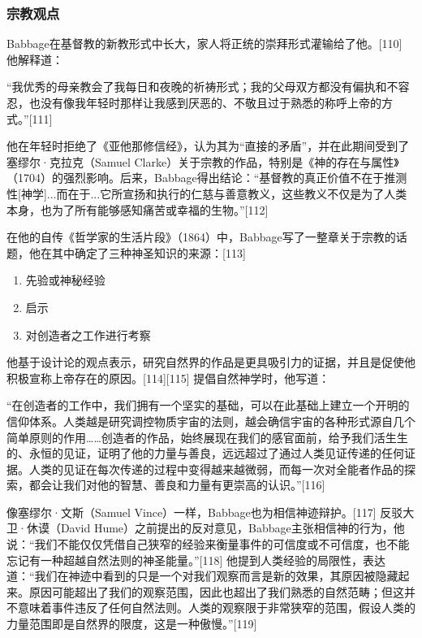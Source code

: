 \subsubsection{宗教观点}
Babbage在基督教的新教形式中长大，家人将正统的崇拜形式灌输给了他。[110] 他解释道：

“我优秀的母亲教会了我每日和夜晚的祈祷形式；我的父母双方都没有偏执和不容忍，也没有像我年轻时那样让我感到厌恶的、不敬且过于熟悉的称呼上帝的方式。”[111]

他在年轻时拒绝了《亚他那修信经》，认为其为“直接的矛盾”，并在此期间受到了塞缪尔·克拉克（Samuel Clarke）关于宗教的作品，特别是《神的存在与属性》（1704）的强烈影响。后来，Babbage得出结论：“基督教的真正价值不在于推测性[神学]...而在于...它所宣扬和执行的仁慈与善意教义，这些教义不仅是为了人类本身，也为了所有能够感知痛苦或幸福的生物。”[112]

在他的自传《哲学家的生活片段》（1864）中，Babbage写了一整章关于宗教的话题，他在其中确定了三种神圣知识的来源：[113]
\begin{enumerate}
\item 先验或神秘经验
\item 启示
\item 对创造者之工作进行考察
\end{enumerate}
他基于设计论的观点表示，研究自然界的作品是更具吸引力的证据，并且是促使他积极宣称上帝存在的原因。[114][115] 提倡自然神学时，他写道：

“在创造者的工作中，我们拥有一个坚实的基础，可以在此基础上建立一个开明的信仰体系。人类越是研究调控物质宇宙的法则，越会确信宇宙的各种形式源自几个简单原则的作用……创造者的作品，始终展现在我们的感官面前，给予我们活生生的、永恒的见证，证明了他的力量与善良，远远超过了通过人类见证传递的任何证据。人类的见证在每次传递的过程中变得越来越微弱，而每一次对全能者作品的探索，都会让我们对他的智慧、善良和力量有更崇高的认识。”[116]

像塞缪尔·文斯（Samuel Vince）一样，Babbage也为相信神迹辩护。[117] 反驳大卫·休谟（David Hume）之前提出的反对意见，Babbage主张相信神的行为，他说：“我们不能仅仅凭借自己狭窄的经验来衡量事件的可信度或不可信度，也不能忘记有一种超越自然法则的神圣能量。”[118] 他提到人类经验的局限性，表达道：“我们在神迹中看到的只是一个对我们观察而言是新的效果，其原因被隐藏起来。原因可能超出了我们的观察范围，因此也超出了我们熟悉的自然范畴；但这并不意味着事件违反了任何自然法则。人类的观察限于非常狭窄的范围，假设人类的力量范围即是自然界的限度，这是一种傲慢。”[119]
